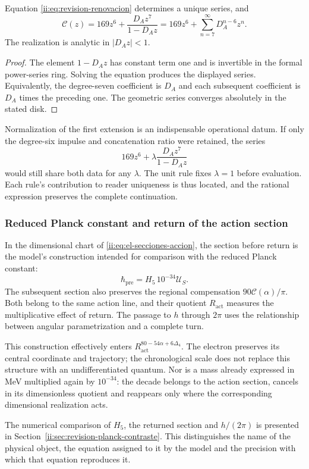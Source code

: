 \begin{proposition}
Equation \eqref{ii:eq:revision-renovacion} determines a unique series, and
\[
 \mathscr C(z)=169z^6+\frac{D_Az^7}{1-D_Az}
             =169z^6+\sum_{n=7}^{\infty}D_A^{n-6}z^n.
\]
The realization is analytic in \(|D_Az|<1\).
\end{proposition}
\begin{proof}
The element \(1-D_Az\) has constant term one and is invertible in the formal power-series ring. Solving the equation produces the displayed series. Equivalently, the degree-seven coefficient is \(D_A\) and each subsequent coefficient is \(D_A\) times the preceding one. The geometric series converges absolutely in the stated disk.
\end{proof}

Normalization of the first extension is an indispensable operational datum. If only the degree-six impulse and concatenation ratio were retained, the series
\[
 169z^6+\lambda\frac{D_Az^7}{1-D_Az}
\]
would still share both data for any \(\lambda\). The unit rule fixes \(\lambda=1\) before evaluation. Each rule's contribution to reader uniqueness is thus located, and the rational expression preserves the complete continuation.

\subsubsection{Reduced Planck constant and return of the action section}

In the dimensional chart of \eqref{ii:eq:el-secciones-accion}, the section before return is the model's construction intended for comparison with the reduced Planck constant:
\[
 \hbar_{\mathrm{pre}}=H_5\,10^{-34}\mathcal U_S.
\]
The subsequent section also preserves the regional compensation \(90\mathscr C(\alpha)/\pi\). Both belong to the same action line, and their quotient \(R_{\mathrm{act}}\) measures the multiplicative effect of return. The passage to \(h\) through \(2\pi\) uses the relationship between angular parametrization and a complete turn.

This construction effectively enters \(R_{\mathrm{act}}^{80-54\alpha+6\Delta_4}\). The electron preserves its central coordinate and trajectory; the chronological scale does not replace this structure with an undifferentiated quantum. Nor is a mass already expressed in MeV multiplied again by \(10^{-34}\): the decade belongs to the action section, cancels in its dimensionless quotient and reappears only where the corresponding dimensional realization acts.

The numerical comparison of \(H_5\), the returned section and \(h/(2\pi)\) is presented in Section~\ref{ii:sec:revision-planck-contraste}. This distinguishes the name of the physical object, the equation assigned to it by the model and the precision with which that equation reproduces it.


